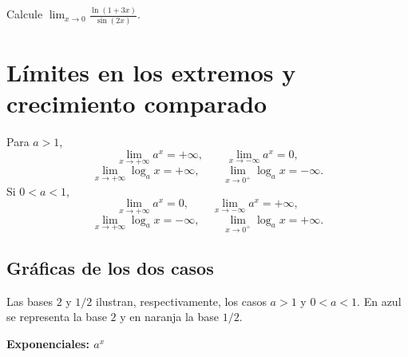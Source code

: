 \documentclass[10pt,a5paper]{article}
\newif\ifmostrarSoluciones
\begin{document}
\begin{ejemplo}
Calcule $\displaystyle\lim_{x\to0}\frac{\ln(1+3x)}{\sin(2x)}$.
\end{ejemplo}
\ifmostrarSoluciones
\begin{solucion}
Se exige $x>-1/3$ y $\sin(2x)\neq0$. En un entorno suficientemente pequeño de $0$, basta excluir $x=0$. Allí,
\[
  \frac{\ln(1+3x)}{\sin(2x)}
  =\frac{\ln(1+3x)}{3x}\,\frac{2x}{\sin(2x)}\,\frac32.
\]
Los cambios $t=3x$ y $u=2x$ permiten reconocer dos factores con límite $1$. El límite solicitado es $3/2$.
\end{solucion}
\else\vspace{22mm}\fi

\section*{Límites en los extremos y crecimiento comparado}

\begin{proposicion}
Para $a>1$,
\[
  \lim_{x\to+\infty}a^x=+\infty,\qquad
  \lim_{x\to-\infty}a^x=0,
\]
\[
  \lim_{x\to+\infty}\log_a x=+\infty,\qquad
  \lim_{x\to0^+}\log_a x=-\infty.
\]
Si $0<a<1$,
\[
  \lim_{x\to+\infty}a^x=0,\qquad
  \lim_{x\to-\infty}a^x=+\infty,
\]
\[
  \lim_{x\to+\infty}\log_a x=-\infty,\qquad
  \lim_{x\to0^+}\log_a x=+\infty.
\]
\end{proposicion}

\subsection*{Gráficas de los dos casos}
Las bases $2$ y $1/2$ ilustran, respectivamente, los casos $a>1$ y $0<a<1$. En azul se representa la base $2$ y en naranja la base $1/2$.

\begin{center}
\textbf{Exponenciales: $a^x$}\\[2mm]
\end{center}
\end{document}

